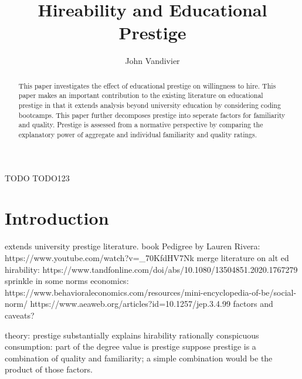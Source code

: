 \documentclass[review]{elsarticle}
\begin{document}
\begin{frontmatter}

    \title{
        Hireability and Educational Prestige
    }

    \author[mymainaddress]{John Vandivier}
    \address[mymainaddress]{4400 University Dr, Fairfax, VA 22030}

    \begin{abstract}
        This paper investigates the effect of educational prestige on willingness to hire.
        This paper makes an important contribution to the existing literature on educational prestige
        in that it extends analysis beyond university education by considering coding bootcamps.
        This paper further decomposes prestige into seperate factors for familiarity and quality.
        Prestige is assessed from a normative perspective by comparing the explanatory power of aggregate and individual familiarity and quality ratings.


    \end{abstract}

    \begin{keyword}
        TODO
        \MSC[2010] TODO123 %
    \end{keyword}

\end{frontmatter}

\pagebreak
\linenumbers

\section{Introduction}

extends university prestige literature. book Pedigree by Lauren Rivera: https://www.youtube.com/watch?v=_70KfdHV7Nk
merge literature on alt ed hirability: https://www.tandfonline.com/doi/abs/10.1080/13504851.2020.1767279
sprinkle in some norms economics:
https://www.behavioraleconomics.com/resources/mini-encyclopedia-of-be/social-norm/
https://www.aeaweb.org/articles?id=10.1257/jep.3.4.99
factors and caveats?

theory: prestige substantially explains hirability
rationally conspicuous consumption: part of the degree value is prestige
suppose prestige is a combination of quality and familiarity; a simple combination would be the product of those factors.
\end{document}
